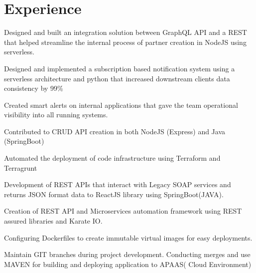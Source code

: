 \documentclass[]{deedy-resume-openfont}
\begin{document}
\begin{minipage}[t][18cm]{0.66\textwidth}


\section{Experience}

\vspace{\topsep} %
\begin{tightemize}
\item Designed and built an integration solution between GraphQL API and a REST that helped streamline the internal process of partner creation in NodeJS using serverless.
\item Designed and implemented a subscription based notification system using a serverless architecture and python that increased downstream clients data consistency by 99\%
\item Created smart alerts on internal applications that gave the team operational visibility into all running systems.
\item Contributed to CRUD API creation in both NodeJS (Express) and Java (SpringBoot)
\item Automated the deployment of code infrastructure using Terraform and Terragrunt

\end{tightemize}
\sectionsep


\begin{tightemize}
\item Development of REST APIs that interact with Legacy SOAP services and returns JSON format data to ReactJS library using SpringBoot(JAVA).
\item Creation of REST API and Microservices automation framework using REST assured libraries and Karate IO.
\item Configuring Dockerfiles to create immutable virtual images for easy deployments.
\item Maintain GIT branches during project development. Conducting merges and use MAVEN for building and deploying application to APAAS( Cloud Environment)


\end{tightemize}
\end{minipage}
\end{document}
